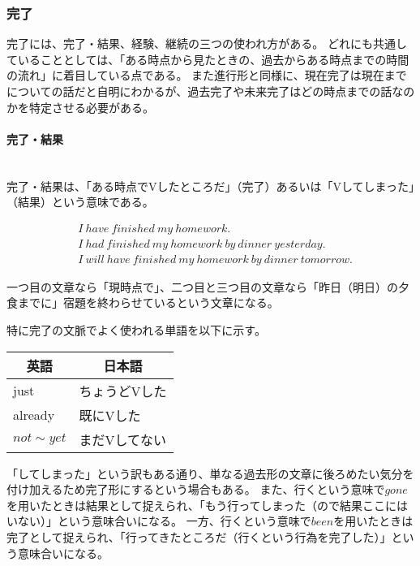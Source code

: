\subsubsection{完了}

完了には、完了・結果、経験、継続の三つの使われ方がある。
どれにも共通していることとしては、「ある時点から見たときの、過去からある時点までの時間の流れ」に着目している点である。
また進行形と同様に、現在完了は現在までについての話だと自明にわかるが、過去完了や未来完了はどの時点までの話なのかを特定させる必要がある。

\paragraph{完了・結果}\quad\\

完了・結果は、「ある時点でVしたところだ」（完了）あるいは「Vしてしまった」（結果）という意味である。

\begin{align}
  &I ~ have ~ finished ~ my ~ homework \text{.}\\
  &I ~ had  ~ finished ~ my ~ homework ~ by ~ dinner ~ yesterday \text{.}\\
  &I ~ will ~ have ~ finished ~ my ~ homework ~ by ~ dinner ~ tomorrow \text{.}
\end{align}

一つ目の文章なら「現時点で」、二つ目と三つ目の文章なら「昨日（明日）の夕食までに」宿題を終わらせているという文章になる。

特に完了の文脈でよく使われる単語を以下に示す。

\begin{table}[H]
  \centering
  \begin{tabular}{ll}
    \hline
    \multicolumn{1}{c}{英語} & \multicolumn{1}{c}{日本語}\\
    \hline \hline
    just & ちょうどVした \\
    already & 既にVした \\
    $not \sim yet$ & まだVしてない \\
    \hline
  \end{tabular}
\end{table}

「してしまった」という訳もある通り、単なる過去形の文章に後ろめたい気分を付け加えるため完了形にするという場合もある。
また、行くという意味で$gone$を用いたときは結果として捉えられ、「もう行ってしまった（ので結果ここにはいない）」という意味合いになる。
一方、行くという意味で$been$を用いたときは完了として捉えられ、「行ってきたところだ（行くという行為を完了した）」という意味合いになる。

